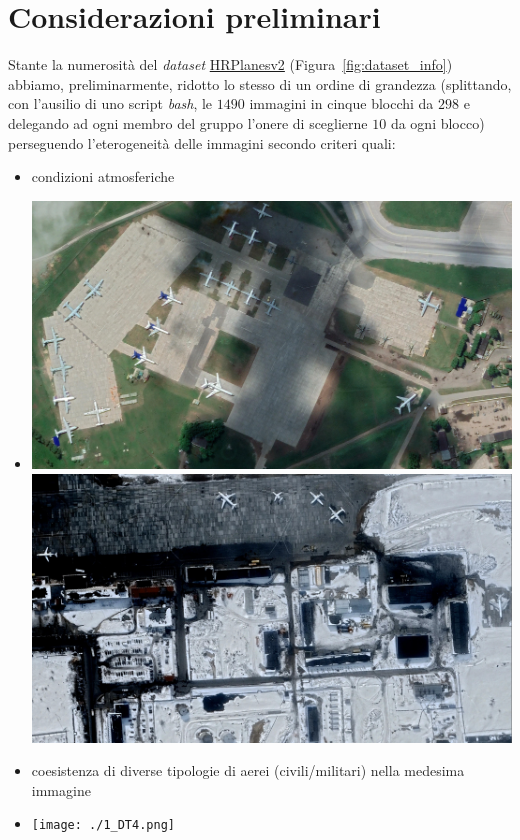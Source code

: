 \documentclass[a4paper, 12pt]{report}
\begin{document}



\section*{Considerazioni preliminari}


Stante la numerosità del \emph{dataset} \href{https://github.com/dilsadunsal/HRPlanesv2-Data-Set}{HRPlanesv2} (Figura~\ref{fig:dataset_info}) abbiamo, preliminarmente, ridotto lo stesso
di un ordine di grandezza (splittando, con l'ausilio di uno script \emph{bash}, le $1490$ immagini in cinque blocchi da $298$ e delegando ad ogni membro del gruppo l'onere di sceglierne $10$ da ogni blocco) perseguendo l'eterogeneità delle immagini secondo criteri quali:

\begin{itemize}
    \item condizioni atmosferiche 
    \item[] %
        \begin{minipage}[t]{\linewidth}
            \centering
            \includegraphics[width=0.4\linewidth]{./488_DT8.png}
            \quad %
            \includegraphics[width=0.4\linewidth]{./226_DT8.png}
        \end{minipage}
    \item coesistenza di diverse tipologie di aerei (civili/militari) nella medesima immagine
    \item[] %
        \begin{minipage}[t]{\linewidth}
            \centering
            \texttt{[image: ./1\_DT4.png]}
        \end{minipage}
\end{itemize}
\end{document}
